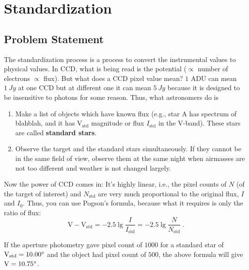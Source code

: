 \chapter{Standardization}

\section{Problem Statement}
The standardization process is a process to convert the instrumental values to physical values. In CCD, what is being read is the potential ($ \propto $ number of electrons $ \propto $ flux). But what does a CCD pixel value mean? $ 1 $ ADU can mean $ \SI{1}{Jy} $ at one CCD but at different one it can mean $ \SI{5}{Jy} $ because it is designed to be insensitive to photons for some reason. Thus, what astronomers do is

\begin{enumerate}
\item Make a list of objects which have known flux (e.g., star A has spectrum of blahblah, and it has $ \mathrm{V}_\mathrm{std} $ magnitude or flux $ I_\mathrm{std} $ in the V-band). These stars are called \textbf{standard stars}.
\item Observe the target and the standard stars simultaneously. If they cannot be in the same field of view, observe them at the same night when airmasses are not too different and weather is not changed largely.
\end{enumerate}
Now the power of CCD comes in: It's highly linear, i.e., the pixel counts of $ N $ (of the target of interest) and $ N_\mathrm{std} $ are very much proportional to the original flux, $ I $ and $ I_0 $. Thus, you can use Pogson's formula, because what it requires is only the ratio of flux: 
\begin{equation}\label{eq: Pogson}
  \mathrm{V} - \mathrm{V}_\mathrm{std} 
    = -2.5 \lg \frac{I}{I_\mathrm{std}} 
    =  -2.5 \lg \frac{N}{N_\mathrm{std}} ~.
\end{equation}

\begin{ex}
If the aperture photometry gave pixel count of $ 1000 $ for a standard star of $ \mathrm{V}_\mathrm{std} = \m{10.00} $ and the object had pixel count of $ 500 $, the above formula will give $ \mathrm{V} = \m{10.75} $. 
\end{ex}

